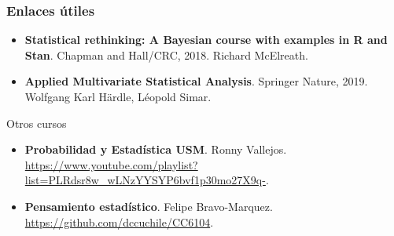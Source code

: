 \documentclass[table]{beamer}
\begin{document}
\begin{frame}
\frametitle{Enlaces útiles}
\begin{itemize}
  \item \textbf{Statistical rethinking: A Bayesian course with examples in R and Stan}. Chapman and Hall/CRC, 2018. Richard McElreath.%
           \item \textbf{Applied Multivariate Statistical Analysis}. Springer Nature, 2019. Wolfgang Karl H\"ardle, L\'eopold Simar.
\end{itemize}         
    \begin{block}{Otros cursos}
        \begin{itemize}
            \item \textbf{Probabilidad y Estadística USM}. Ronny Vallejos. \url{https://www.youtube.com/playlist?list=PLRdsr8w_wLNzYYSYP6bvf1p30mo27X9q-}.
            \item \textbf{Pensamiento estadístico}. Felipe Bravo-Marquez. \url{https://github.com/dccuchile/CC6104}.
        \end{itemize}
    \end{block}
\end{frame}

\end{document}
